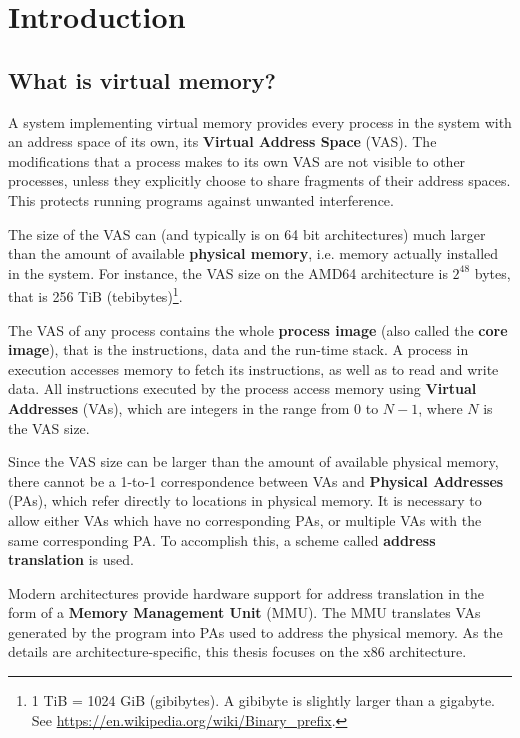 \documentclass[shortabstract, english]{iithesis}
\author {Jakub Piecuch}
\begin{document}

\chapter{Introduction}

\section{What is virtual memory?} \label{section:whatisvm}

A system implementing virtual memory provides every process in the system with
an address space of its own, its \textbf{Virtual Address Space} (VAS). The
modifications that a process makes to its own VAS are not visible to other
processes, unless they explicitly choose to share fragments of their address
spaces. This protects running programs against unwanted interference.

The size of the VAS can (and typically is on 64 bit architectures) much larger
than the amount of available \textbf{physical memory}, i.e. memory actually
installed in the system. For instance, the VAS size on the AMD64 architecture is
$2^{48}$ bytes, that is 256 TiB (tebibytes)\footnote{
  1 TiB = 1024 GiB (gibibytes). A gibibyte is slightly larger than a gigabyte. \\
  See \url{https://en.wikipedia.org/wiki/Binary_prefix}.}.

The VAS of any process contains the whole \textbf{process image} (also called
the \textbf{core image}), that is the instructions, data and the run-time stack.
A process in execution accesses memory to fetch its instructions, as well as to
read and write data. All instructions executed by the process access memory
using \textbf{Virtual Addresses} (VAs), which are integers in the range from 0
to $N-1$, where $N$ is the VAS size.

Since the VAS size can be larger than the amount of available physical memory,
there cannot be a 1-to-1 correspondence between VAs and \textbf{Physical
  Addresses} (PAs), which refer directly to locations in physical memory. It is
necessary to allow either VAs which have no corresponding PAs, or multiple VAs
with the same corresponding PA. To accomplish this, a scheme called
\textbf{address translation} is used.

Modern architectures provide hardware support for address translation in the
form of a \textbf{Memory Management Unit} (MMU). The MMU translates VAs
generated by the program into PAs used to address the physical memory. As the
details are architecture-specific, this thesis focuses on the x86 architecture.
\end{document}
